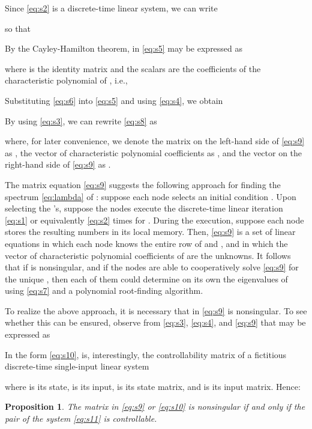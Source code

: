 \documentclass[11pt]{article}
\theoremstyle{plain}
\newtheorem{proposition}{Proposition}
\theoremstyle{definition}
\theoremstyle{remark}
\begin{document}
Since \eqref{eq:s2} is a discrete-time linear system, we can write

so that

By the Cayley-Hamilton theorem,  in \eqref{eq:s5} may be expressed as

where  is the identity matrix and the scalars  are the  coefficients of the characteristic polynomial of , i.e.,

Substituting \eqref{eq:s6} into \eqref{eq:s5} and using \eqref{eq:s4}, we obtain

By using \eqref{eq:s3}, we can rewrite \eqref{eq:s8} as

where, for later convenience, we denote the matrix on the left-hand side of \eqref{eq:s9} as , the vector of characteristic polynomial coefficients as , and the vector on the right-hand side of \eqref{eq:s9} as .

The matrix equation \eqref{eq:s9} suggests the following approach for finding the spectrum \eqref{eq:lambda} of : suppose each node  selects an initial condition . Upon selecting the 's, suppose the nodes execute the discrete-time linear iteration \eqref{eq:s1} or equivalently \eqref{eq:s2}  times for . During the execution, suppose each node  stores the resulting  numbers  in its local memory. Then, \eqref{eq:s9} is a set of  linear equations in which each node  knows the entire row  of  and , and in which the vector  of  characteristic polynomial coefficients  of  are the  unknowns. It follows that if  is nonsingular, and if the nodes are able to cooperatively solve \eqref{eq:s9} for the unique , then each of them could determine on its own the  eigenvalues  of  using \eqref{eq:s7} and a polynomial root-finding algorithm.

To realize the above approach, it is necessary that  in \eqref{eq:s9} is nonsingular. To see whether this can be ensured, observe from \eqref{eq:s3}, \eqref{eq:s4}, and \eqref{eq:s9} that  may be expressed as

In the form \eqref{eq:s10},  is, interestingly, the controllability matrix of a fictitious discrete-time single-input linear system

where  is its state,  is its input,  is its state matrix, and  is its input matrix. Hence:

\begin{proposition}\label{pro:AWy0}
The matrix  in \eqref{eq:s9} or \eqref{eq:s10} is nonsingular if and only if the pair  of the system \eqref{eq:s11} is controllable.
\end{proposition}
\end{document}
